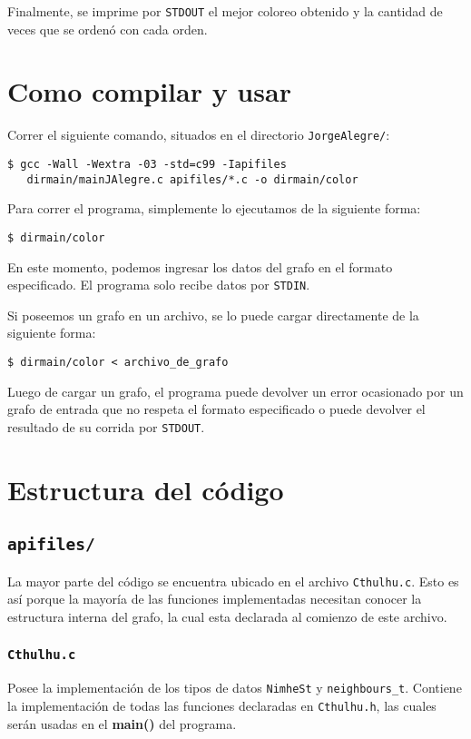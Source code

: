 \documentclass[11pt]{article}   	%
\begin{document}
Finalmente, se imprime por \texttt{STDOUT} el mejor coloreo obtenido y la cantidad de veces que se ordenó
con cada orden.
\clearpage

\section{Como compilar y usar}
Correr el siguiente comando, situados en el directorio \texttt{JorgeAlegre/}:
\lstset{style=custombash}
\begin{lstlisting}
$ gcc -Wall -Wextra -03 -std=c99 -Iapifiles 
   dirmain/mainJAlegre.c apifiles/*.c -o dirmain/color
\end{lstlisting}

Para correr el programa, simplemente lo ejecutamos de la siguiente forma:
\begin{lstlisting}
$ dirmain/color
\end{lstlisting}
En este momento, podemos ingresar los datos del grafo en el formato especificado. El programa
solo recibe datos por \texttt{STDIN}.

Si poseemos un grafo en un archivo, se lo puede cargar directamente de la siguiente forma:
\begin{lstlisting}
$ dirmain/color < archivo_de_grafo
\end{lstlisting}

Luego de cargar un grafo, el programa puede devolver un error ocasionado por un grafo de entrada
que no respeta el formato especificado o puede devolver el resultado de su corrida por \texttt{STDOUT}.
\clearpage

\section{Estructura del código}
\subsection{\texttt{apifiles/}}
La mayor parte del código se encuentra ubicado en el archivo \texttt{Cthulhu.c}. Esto es así porque
la mayoría de las funciones implementadas necesitan conocer la estructura interna del grafo, la cual esta
declarada al comienzo de este archivo.

\subsubsection{\texttt{Cthulhu.c}}
Posee la implementación de los tipos de datos \texttt{NimheSt} y \texttt{neighbours\_t}.
Contiene la implementación de todas las funciones declaradas en \texttt{Cthulhu.h}, las cuales serán usadas
en el \textbf{main()} del programa.
\end{document}
